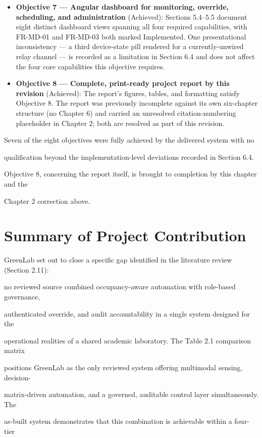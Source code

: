 \begin{itemize}
	\item \textbf{Objective 7 --- Angular dashboard for monitoring, override, scheduling, and administration} (Achieved): Sections 5.4--5.5 document eight distinct dashboard views spanning all four required capabilities, with FR-MD-01 and FR-MD-03 both marked Implemented. One presentational inconsistency --- a third device-state pill rendered for a currently-unwired relay channel --- is recorded as a limitation in Section 6.4 and does not affect the four core capabilities this objective requires.

	\item \textbf{Objective 8 --- Complete, print-ready project report by this revision} (Achieved): The report's figures, tables, and formatting satisfy Objective 8. The report was previously incomplete against its own six-chapter structure (no Chapter 6) and carried an unresolved citation-numbering placeholder in Chapter 2; both are resolved as part of this revision.
\end{itemize}

Seven of the eight objectives were fully achieved by the delivered system with no

qualification beyond the implementation-level deviations recorded in Section 6.4.

Objective 8, concerning the report itself, is brought to completion by this chapter and the

Chapter 2 correction above.


\section{Summary of Project Contribution}
GreenLab set out to close a specific gap identified in the literature review (Section 2.11):

no reviewed source combined occupancy-aware automation with role-based governance,

authenticated override, and audit accountability in a single system designed for the

operational realities of a shared academic laboratory. The Table 2.1 comparison matrix

positions GreenLab as the only reviewed system offering multimodal sensing, decision-

matrix-driven automation, and a governed, auditable control layer simultaneously. The

as-built system demonstrates that this combination is achievable within a four-tier

